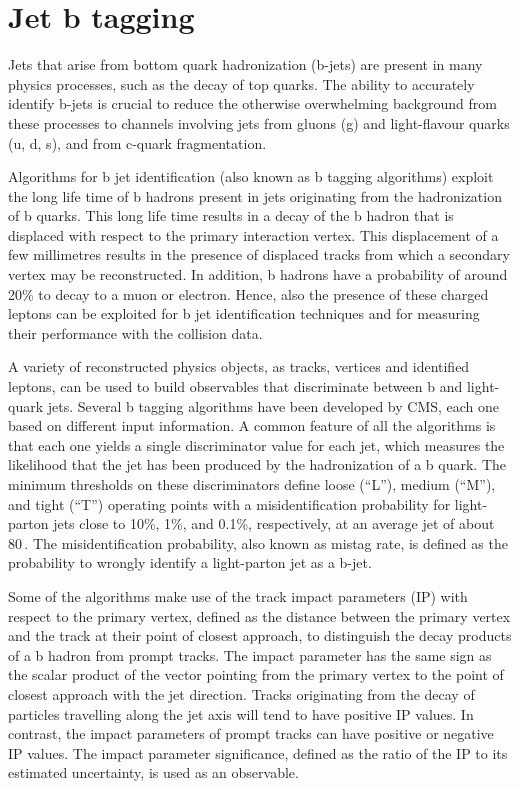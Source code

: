 \section{Jet b tagging}\label{sec:btag}

Jets that arise from bottom quark hadronization (b-jets) are present in many physics processes,
such as the decay of top quarks. The ability to accurately identify b-jets is crucial to reduce the otherwise overwhelming background from these processes to channels involving jets from gluons (g) and
light-flavour quarks (u, d, s), and from c-quark fragmentation.

Algorithms for b jet identification (also known as b tagging algorithms) exploit the long life time of b hadrons present in jets originating from the hadronization of b quarks. This long life time results in a decay of the b hadron that is displaced with respect to the primary interaction vertex. This displacement of a few millimetres results in the presence of displaced tracks from which a secondary vertex may be reconstructed. In addition, b hadrons have a probability of around 20\% to decay to a muon or electron. Hence, also the presence of these charged leptons can be exploited for b jet identification techniques and for measuring their performance with the collision data.

A variety of reconstructed physics objects, as tracks, vertices and identified leptons, can be used to build observables that discriminate between b and light-quark jets. Several b tagging algorithms have been developed by CMS, each one based on different input information. A common feature of all the algorithms is that each one yields a single discriminator value for each jet, which measures the likelihood that the jet has been produced by the hadronization of a b quark. The minimum thresholds on these discriminators define loose (``L''), medium (``M''), and tight (``T'') operating points with a misidentification probability for light-parton jets close to 10\%, 1\%, and 0.1\%, respectively, at an average jet \pt of about 80\,\GeV. The misidentification probability, also known as mistag rate, is defined as the probability to wrongly identify a light-parton jet as a b-jet.

Some of the algorithms make use of the track impact parameters (IP) with respect to the primary vertex, defined as the distance between the primary vertex and the track at their point of closest approach, to distinguish the decay products of a b hadron from prompt tracks. The impact parameter has the same sign as the scalar product of the vector pointing from the primary vertex to the point of closest approach with the jet direction. Tracks originating from the decay of particles travelling along the jet axis will tend to have positive IP values. In contrast, the impact parameters of prompt tracks can have positive or negative IP values. The impact parameter significance, defined as the ratio of the IP to its estimated uncertainty, is used as an observable.

